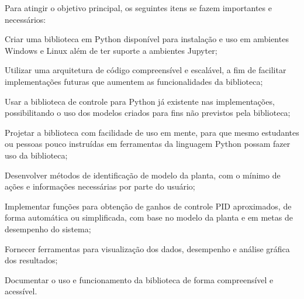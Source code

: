 Para atingir o objetivo principal, os seguintes itens se fazem importantes e necessários:
\begin{alineas}
    \item \label{itm:oe1} Criar uma biblioteca em Python disponível para instalação e uso em ambientes Windows e Linux
    além de ter suporte a ambientes Jupyter;
    \item \label{itm:oe2} Utilizar uma arquitetura de código compreensível e escalável, a fim de facilitar implementações futuras
    que aumentem as funcionalidades da biblioteca;
    \item \label{itm:oe3} Usar a biblioteca de controle para Python já existente nas implementações, possibilitando o uso dos modelos
    criados para fins não previstos pela biblioteca;
    \item \label{itm:oe4} Projetar a biblioteca com facilidade de uso em mente, para que mesmo estudantes ou pessoas pouco instruídas
    em ferramentas da linguagem Python possam fazer uso da biblioteca;
    \item \label{itm:oe5} Desenvolver métodos de identificação de modelo da planta, com o mínimo de ações e informações necessárias por
    parte do usuário;
    \item \label{itm:oe6} Implementar funções para obtenção de ganhos de controle PID aproximados, de forma automática ou simplificada,
    com base no modelo da planta e em metas de desempenho do sistema;
    \item \label{itm:oe7} Fornecer ferramentas para visualização dos dados, desempenho e análise gráfica dos resultados;
    \item \label{itm:oe8} Documentar o uso e funcionamento da biblioteca de forma compreensível e acessível.
\end{alineas}